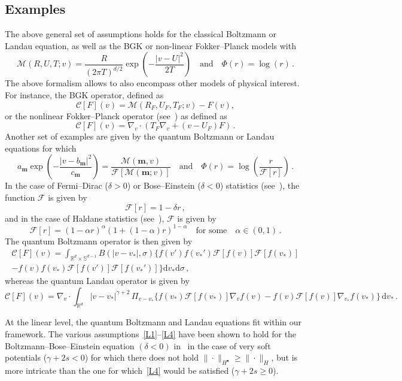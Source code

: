 \documentclass[AHL,Unicode,longabstracts,published]{cedram}
\renewcommand{\d}{\mathrm{d}}
\newcommand{\R}{\mathbb{R}}
\renewcommand{\S}{\mathbb{S}}
\newcommand{\CC}{\mathcal{C}}
\newcommand{\FF}{\mathcal{F}}
\newcommand{\MM}{\mathcal{M}}
\newcommand{\Ss}{H}
\newcommand{\Ssp}{H^{\bullet}}
\renewcommand*\ge{\geqslant}
\begin{document}
\subsection*{Examples}

The above general set of assumptions holds for the classical Boltzmann or Landau equation, as well as the BGK or non-linear Fokker--Planck models with
\[
\MM(R, U, T ; v) = \frac{R}{ (2 \pi T)^{d/2} } \exp\left(- \frac{|v-U|^2}{2 T} \right) \quad \text{and} \quad \Phi(r) = \log(r) \,.
\]
The above formalism allows to also encompass other models of physical interest. For instance, the BGK operator, defined as
\[
\CC[F](v) = \MM(R_F, U_F, T_F ; v) -F(v),
\]
or the nonlinear Fokker--Planck operator (see~\cite[Section~1.6]{V2002}) as defined as
\[
\CC[F](v) = \nabla_v \cdot (T_F \nabla_v + (v - U_F) F) \,.
\]
Another set of examples are given by the quantum Boltzmann or Landau equations for which
\[
a_{\bm m} \exp\left(-\frac{|v-b_{\bm m} |^2}{c_{\bm m}} \right) = \frac{\MM({\bm m}, v)}{ \FF[\MM({\bm m} ; v)] } \quad \text{and} \quad \Phi(r) = \log\left(\frac{r}{\FF[r] } \right) \,.
\]
In the case of Fermi--Dirac ($\delta > 0$) or Bose--Einstein ($\delta < 0$) statistics (see~\cite{D1994, ABL}), the function $\FF$ is given by
\[
\FF[r] = 1 -\delta r \,,
\]
and in the case of Haldane statistics (see~\cite{AN2015}), $\FF$ is given by
\[
\FF[r] = (1-\alpha r)^{\alpha} \left(1 + (1-\alpha) r\right)^{1-\alpha} \quad \text{for some} \quad \alpha \in (0, 1) \,.
\]
The quantum Boltzmann operator is then given by
\begin{multline*}
\CC[F](v) = \int_{\R^{d}\times\S^{d-1}}B(|v-v_{*}|,\sigma) \Big\{ f(v')f(v_{*}') \FF[f(v)] \FF[f(v_*)] \\
-f(v)f(v_{*}) \FF[f(v')] \FF[f(v_*')] \Big\} \d v_{*}\d\sigma \,,
\end{multline*}
whereas the quantum Landau operator is given by
\[
\CC[F](v) =
\nabla_{v}\cdot \int_{\R^{d}} |v-v_{*}|^{\gamma+2} \, \Pi_{v-v_{*}}
\Big\{f(v_{*}) \FF[f(v_*)] \nabla_{v} f(v) - f(v) \FF[f(v)]{\nabla_{v_{*}} f}(v_{*}) \Big\}
\, \d v_{*} \,.
\]

At the linear level, the quantum Boltzmann and Landau equations fit within our framework. The various assumptions~\eqref{L1}--\eqref{L4} have been shown to hold for the Boltzmann--Bose--Einstein equation $(\delta < 0)$ in~\cite{YZ22, Z22} in the case of very soft potentials ($\gamma + 2 s < 0$) for which there does not hold $\| \cdot \|_{\Ssp} \ge \| \cdot \|_\Ss$, but is more intricate than the one for which~\eqref{L4} would be satisfied ($\gamma + 2 s \ge 0$).
\end{document}
